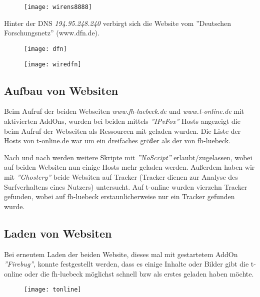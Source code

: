 \documentclass{scrartcl}
\begin{document}
  \begin{figure}
  \centering
    \texttt{[image: wirens8888]}
    \label{fig:wirens8888}
  \end{figure}
  
  
  Hinter der DNS \textit{194.95.248.240} verbirgt sich die Website vom ''Deutschen Forschungsnetz'' (www.dfn.de).
    \begin{figure}
  \centering
    \texttt{[image: dfn]}
    \label{fig:dfn}
  \end{figure}
  
  \begin{figure}
  \centering
    \texttt{[image: wiredfn]}
    \label{fig:wiredfn}
  \end{figure}
  
  \subsection[Aufgabe 6 Aufbau von Websiten]{Aufbau von Websiten}
  
  Beim Aufruf der beiden Webseiten \emph{\textit{www.fh-luebeck.de}} und \emph{\textit{www.t-online.de}} mit aktivierten AddOns, wurden bei beiden mittels \textit{''IPvFox''} Hosts angezeigt die beim Aufruf der Webseiten als Ressourcen mit geladen wurden. Die Liste der Hosts von t-online.de war um ein dreifaches größer als der von fh-luebeck. 
  
  Nach und nach werden weitere Skripte mit \textit{''NoScript''} erlaubt/zugelassen, wobei auf beiden Websiten nun einige Hosts mehr geladen werden. Außerdem haben wir mit \textit{''Ghostery''} beide Websiten auf Tracker (Tracker dienen zur Analyse des Surfverhaltens eines Nutzers) untersucht. Auf t-online wurden vierzehn Tracker gefunden, wobei auf fh-luebeck erstaunlicherweise nur ein Tracker gefunden wurde.
  
  \subsection[Aufgabe 7 Laden von Websiten]{Laden von Websiten}
  
  Bei erneutem Laden der beiden Website, dieses mal mit gestartetem AddOn \textit{''Firebug''}, konnte festgestellt werden, dass es einige Inhalte oder Bilder gibt die t-online oder die fh-luebeck möglichst schnell bzw als erstes geladen haben möchte. 
  
  \begin{figure}
    \texttt{[image: tonline]}
    \label{fig:tonline}
  \end{figure}
  
\end{document}
